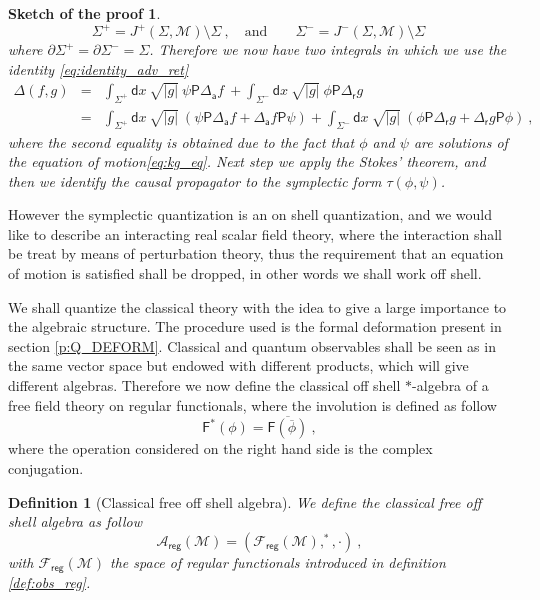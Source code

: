 \documentclass[11pt]{book}
\newcommand{\reg}{\mathsf{reg}}
\newcommand{\abs}[1]{\left|#1\right|}
\newcommand{\Acal}{\mathcal{A}}
\newcommand{\Fcal}{\mathcal{F}}
\newcommand{\Mcal}{\mathcal{M}}
\newcommand{\Fsf}{\mathsf{F}}
\newcommand{\Psf}{\mathsf{P}}
\newcommand{\asf}{\mathsf{a}}
\newcommand{\dsf}{\mathsf{d}}
\newcommand{\rsf}{\mathsf{r}}
\theoremstyle{break}
\newtheorem{definition}{Definition}[chapter]
\newtheorem{sketch}{Sketch of the proof}[chapter]
\begin{document}
\begin{sketch}
%
\begin{equation*}
\Sigma^+ = J^+(\Sigma,\Mcal) \setminus \Sigma \ , \quad \mbox{and} \qquad \Sigma^- = J^-(\Sigma,\Mcal) \setminus \Sigma \ 
\end{equation*}
%
where $\partial \Sigma^+ = \partial \Sigma^- = \Sigma$. 
Therefore we now have  two integrals in which we use the identity \eqref{eq:identity_adv_ret}
%
\begin{eqnarray*}
\Delta(f,g) &=& \int_{\Sigma^+} \dsf x \ \sqrt{\abs{g}} \ \psi \Psf \Delta_\asf f \ + \int_{\Sigma^-} \dsf x \ \sqrt{\abs{g}} \ \phi \Psf \Delta_\rsf g \\
%
&=& 
\int_{\Sigma^+} \dsf x \ \sqrt{\abs{g}} \ 
\left( \psi \Psf \Delta_\asf f + \Delta_\asf f \Psf \psi \right) 
+ 
\int_{\Sigma^-} \dsf x \ \sqrt{\abs{g}} \ 
\left( \phi \Psf \Delta_\rsf g + \Delta_\rsf g \Psf \phi \right) \ ,
\end{eqnarray*}
%
where the second equality is obtained due to the fact that $\phi$ and $\psi$ are solutions of the equation of motion\eqref{eq:kg_eq}. Next step we apply the Stokes' theorem, and then we identify the causal propagator to the symplectic form $\tau(\phi,\psi)$.
\end{sketch}


However the symplectic quantization is an on shell quantization, and we would like to describe an interacting real scalar field theory, where the interaction shall be treat by means of perturbation theory, thus the requirement that an equation of motion is satisfied shall be dropped, in other words we shall work off shell. 


We shall quantize the classical theory with the idea to give a large importance to the algebraic structure. The procedure used is the formal deformation present in section \ref{p:Q_DEFORM}. Classical and quantum observables shall be seen as in the same vector space but endowed with different products, which will give different algebras. Therefore we now define the classical off shell $\ast$-algebra of a free field theory on regular functionals, where the involution is defined as follow
%
\begin{equation}
\Fsf^\ast(\phi) =  \overline{\Fsf(\overline{\phi})} \ , 
\label{eq:involution}
\end{equation}
%
where the operation considered on the right hand side is the complex conjugation. 


\begin{definition}[Classical free off shell algebra]\label{def:alg_clas}
We define the classical free off shell algebra as follow
%
\begin{equation}
\Acal_\reg(\Mcal) = \left(\Fcal_\reg(\Mcal), ^\ast , \cdot\right) \ ,
\label{eq:alg_clas}
\end{equation}
%
with $\Fcal_\reg(\Mcal)$ the space of regular functionals introduced in definition \ref{def:obs_reg}.
\end{definition}
\end{document}
